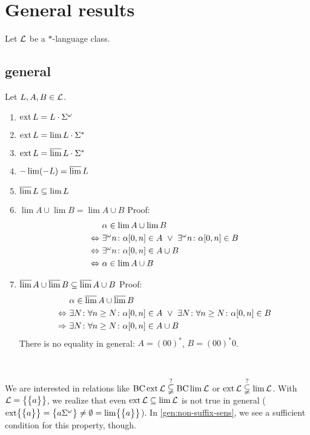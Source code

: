 \section{General results}
\label{general-results}


Let $\mathcal{L}$ be a $*$-language class.

\subsection{general}
\label{gen:general}
Let $L,A,B \in \mathcal{L}$.
\begin{enumerate}
\item $\operatorname{ext} L = L \cdot \Sigma^\omega$
\item $\operatorname{ext} L = \lim L \cdot \Sigma^*$ %
\item $\operatorname{ext} L = \operatorname{\overline{lim}} L \cdot \Sigma^*$ %
\item $- \lim(-L) = \operatorname{\overline{lim}} L$
\item $\operatorname{\overline{lim}} L \subseteq \lim L$
\item $\lim A \cup \lim B = \lim A \cup B$ \newline %
Proof:
\begin{align*}
& \alpha \in \lim A \cup \lim B \\
\Leftrightarrow \ & \existsinf n \colon \alpha[0,n] \in A \ \vee \ \existsinf n \colon \alpha[0,n] \in B \\
\Leftrightarrow \ & \existsinf n \colon \alpha[0,n] \in A \cup B \\
\Leftrightarrow \ & \alpha \in \lim A \cup B
\end{align*}
\item $\operatorname{\overline{lim}} A \cup \operatorname{\overline{lim}} B \subseteq \operatorname{\overline{lim}} A \cup B$ \newline %
Proof:
\begin{align*}
& \alpha \in \dlim A \cup \dlim B \\
\Leftrightarrow \ & \exists N \colon \forall n \ge N \colon \alpha[0,n] \in A \ \vee \ 
\exists N \colon \forall n \ge N \colon \alpha[0,n] \in B \\
\Rightarrow \ & \exists N \colon \forall n \ge N \colon \alpha[0,n] \in A \cup B
\end{align*}
There is no equality in general: $A = (00)^*$, $B = (00)^*0$.
\end{enumerate}

\

We are interested in relations like $\operatorname{BC} \operatorname{ext} \mathcal{L} \overset{?}{\subsetneqq} \operatorname{BC} \lim \mathcal{L}$ or $\operatorname{ext} \mathcal{L} \overset{?}{\subsetneqq} \lim \mathcal{L}$. With $\Lang = \Set{\Set{a}}$, we realize that even $\operatorname{ext} \mathcal{L} \subseteq \lim \mathcal{L}$ is not true in general ($\ext \Set{\Set{a}} = \Set{a \Sigma^\omega} \neq \emptyset = \lim \Set{\Set{a}}$). In \ref{gen:non-suffix-sens}, we see a sufficient condition for this property, though.

